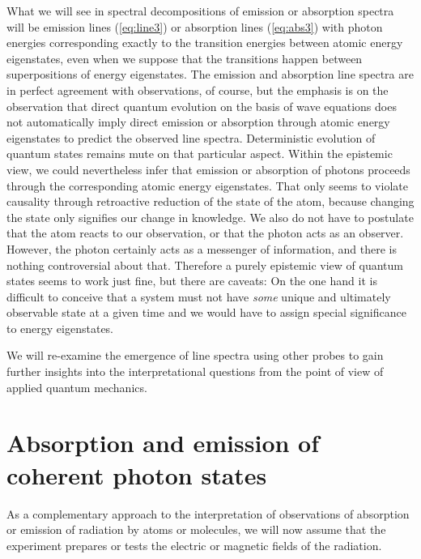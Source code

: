 \documentclass[final,3p,times,twocolumn]{elsarticle3}
\begin{document}
What we will see in spectral decompositions of emission or absorption
spectra will be emission lines (\ref{eq:line3}) or absorption lines
(\ref{eq:abs3}) with photon energies corresponding exactly to the
transition energies between atomic energy eigenstates, even when we
suppose that the transitions happen between superpositions of energy 
eigenstates. The emission and absorption line spectra are in perfect 
agreement with observations, of course, but the emphasis is on the 
observation that direct quantum evolution on the basis of wave equations 
does not automatically imply direct emission or absorption through atomic 
energy eigenstates to predict the observed line spectra. Deterministic
evolution of quantum states remains mute on that particular aspect.
Within the epistemic view, we could nevertheless infer that emission
or absorption of photons proceeds through the corresponding atomic
energy eigenstates. That only seems to violate causality
through retroactive reduction of the state of the atom,
because changing the state only signifies our change in knowledge.
We also do not have to postulate that the atom reacts to our observation,
or that the photon acts as an observer. However, the photon certainly acts
as a messenger of information, and there is nothing controversial about 
that. Therefore a purely epistemic view of quantum states seems to work 
just fine, but there are caveats: On the one hand it is difficult to conceive 
that a system must not have {\it some} unique and ultimately observable
state at a given time and we would have to assign special 
significance to energy eigenstates.

We will re-examine the emergence of line spectra using other probes to gain
 further insights into the interpretational questions from the point of view 
of applied quantum mechanics.

\section{Absorption and emission of coherent photon states}
\label{sec:coherent}

As a complementary approach to the interpretation of observations of
absorption or emission of radiation by atoms or molecules, we will now
assume that the experiment prepares or tests the electric or magnetic fields 
of the radiation. 
\end{document}
